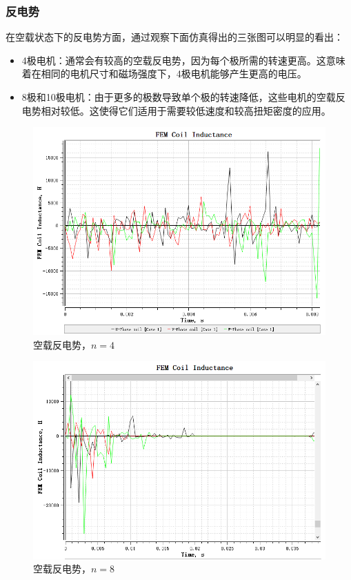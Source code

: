 \documentclass{thuemp}
\begin{document}
\subsubsection{反电势}
在空载状态下的反电势方面，通过观察下面仿真得出的三张图可以明显的看出：
\begin{itemize}
	\item 4极电机：通常会有较高的空载反电势，因为每个极所需的转速更高。这意味着在相同的电机尺寸和磁场强度下，4极电机能够产生更高的电压。
	\item 8极和10极电机：由于更多的极数导致单个极的转速降低，这些电机的空载反电势相对较低。这使得它们适用于需要较低速度和较高扭矩密度的应用。
\end{itemize}

\begin{figure}[H]
  \centering
  \includegraphics[width=1\linewidth]{./img/task3/FEM-n4.png}
  \caption{空载反电势，$n=4$}
\end{figure}
\begin{figure}[H]
  \centering
  \includegraphics[width=1\linewidth]{./img/task3/FEM-n8.png}
  \caption{空载反电势，$n=8$}
\end{figure}
\end{document}

